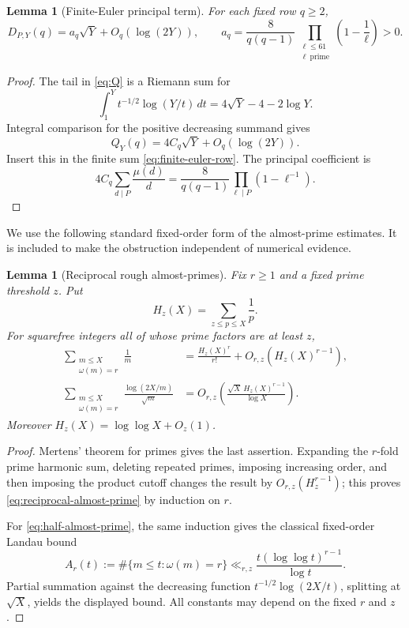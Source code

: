 \documentclass[11pt]{article}
\newtheorem{lemma}[theorem]{Lemma}
\newcommand{\1}{\mathbf 1}
\begin{document}
\begin{lemma}[Finite-Euler principal term]
\label{lem:finite-euler-asymptotic}
For each fixed row $q\ge2$,
\begin{equation}
 D_{P,Y}(q)=a_q\sqrt Y+O_q(\log(2Y)),
 \qquad
 a_q=\frac{8}{q(q-1)}\prod_{\substack{\ell\le61\\\ell\ \mathrm{prime}}}
 \left(1-\frac1\ell\right)>0.
 \label{eq:finite-euler-asymptotic}
\end{equation}
\end{lemma}

\begin{proof}
The tail in \eqref{eq:Q} is a Riemann sum for
\[
 \int_1^Y t^{-1/2}\log(Y/t)\,dt=4\sqrt Y-4-2\log Y.
\]
Integral comparison for the positive decreasing summand gives
\[
 Q_Y(q)=4C_q\sqrt Y+O_q(\log(2Y)).
\]
Insert this in the finite sum \eqref{eq:finite-euler-row}.  The principal
coefficient is
\[
 4C_q\sum_{d\mid P}\frac{\mu(d)}d
 =\frac{8}{q(q-1)}\prod_{\ell\mid P}(1-\ell^{-1}).
\]
\end{proof}

We use the following standard fixed-order form of the almost-prime estimates.
It is included to make the obstruction independent of numerical evidence.

\begin{lemma}[Reciprocal rough almost-primes]
\label{lem:rough-almost-primes}
Fix $r\ge1$ and a fixed prime threshold $z$.  Put
\[
 H_z(X)=\sum_{z\le p\le X}\frac1p.
\]
For squarefree integers all of whose prime factors are at least $z$,
\begin{align}
 \sum_{\substack{m\le X\\\omega(m)=r}}
 \frac1m
 &=\frac{H_z(X)^r}{r!}+O_{r,z}(H_z(X)^{r-1}),
 \label{eq:reciprocal-almost-prime}\\
 \sum_{\substack{m\le X\\\omega(m)=r}}
 \frac{\log(2X/m)}{\sqrt m}
 &=O_{r,z}\!\left(
 \frac{\sqrt X\,H_z(X)^{r-1}}{\log X}
 \right).
 \label{eq:half-almost-prime}
\end{align}
Moreover $H_z(X)=\log\log X+O_z(1)$.
\end{lemma}

\begin{proof}
Mertens' theorem for primes gives the last assertion.  Expanding the $r$-fold
prime harmonic sum, deleting repeated primes, imposing increasing order, and
then imposing the product cutoff changes the result by
$O_{r,z}(H_z^{r-1})$; this proves \eqref{eq:reciprocal-almost-prime} by induction
on $r$.

For \eqref{eq:half-almost-prime}, the same induction gives the classical
fixed-order Landau bound
\[
 A_r(t):=\#\{m\le t:\omega(m)=r\}
 \ll_{r,z}\frac{t(\log\log t)^{r-1}}{\log t}.
\]
Partial summation against the decreasing function
$t^{-1/2}\log(2X/t)$, splitting at $\sqrt X$, yields the displayed bound.
All constants may depend on the fixed $r$ and $z$.
\end{proof}
\end{document}
